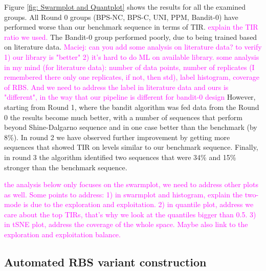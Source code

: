 \documentclass{article}
\newcommand{\mengyan}[1]{\textcolor{magenta}{#1}}
\begin{document}
Figure \ref{fig: Swarmplot and Quantplot} shows the results for all the examined groups. 
All Round 0 groups (BPS-NC, BPS-C, UNI, PPM, Bandit-0) have performed worse than our benchmark sequence in terms of TIR. 
\mengyan{explain the TIR ratio we used.}
The Bandit-0 group performed poorly, due to being trained based on literature data.
\mengyan{Maciej: can you add some analysis on literature data?
to verify 1) our library is "better" 2) it's hard to do ML on available library. some analysis in my mind (for literature data): number of data points, number of replicates (I remembered there only one replicates, if not, then std), label histogram, coverage of RBS.
And we need to address the label in literature data and ours is "different", in the way that our pipeline is different for bandit-0 design}
However, starting from Round 1, where the bandit algorithm was fed data from the Round 0 the results become much better, with a number of sequences that perform beyond Shine-Dalgarno sequence and in one case better than the benchmark (by 8\%).
In round 2 we have observed further improvement by getting more sequences that showed TIR on levels similar to our benchmark sequence.
Finally, in round 3 the algorithm identified two sequences that were 34\% and 15\% stronger than the benchmark sequence.

\mengyan{the analysis below only focuses on the swarmplot, we need to address other plots as well. Some points to address: 
1) in swarmplot and histogram, explain the two-mode is due to the exploration and exploitation. 
2) in quantile plot, address we care about the top TIRs, that's why we look at the quantiles bigger than 0.5.
3) in tSNE plot, address the coverage of the whole space. Maybe also link to the exploration and exploitation balance.}



\subsection{Automated RBS variant construction}
\end{document}
